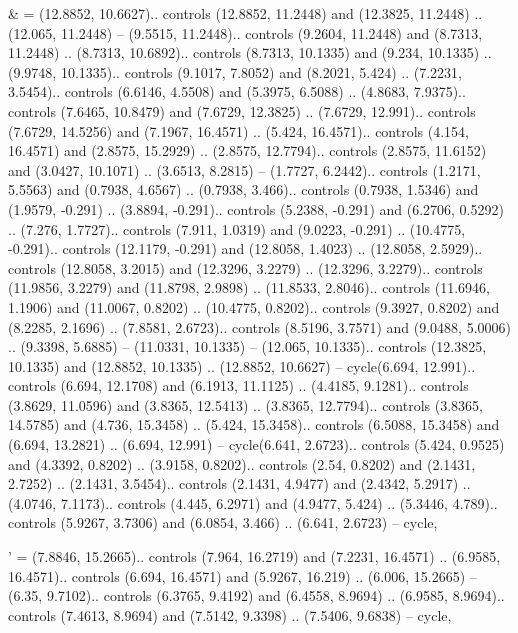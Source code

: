\& = {(12.8852, 10.6627).. controls (12.8852, 11.2448) and (12.3825, 11.2448) .. (12.065, 11.2448) -- (9.5515, 11.2448).. controls (9.2604, 11.2448) and (8.7313, 11.2448) .. (8.7313, 10.6892).. controls (8.7313, 10.1335) and (9.234, 10.1335) .. (9.9748, 10.1335).. controls (9.1017, 7.8052) and (8.2021, 5.424) .. (7.2231, 3.5454).. controls (6.6146, 4.5508) and (5.3975, 6.5088) .. (4.8683, 7.9375).. controls (7.6465, 10.8479) and (7.6729, 12.3825) .. (7.6729, 12.991).. controls (7.6729, 14.5256) and (7.1967, 16.4571) .. (5.424, 16.4571).. controls (4.154, 16.4571) and (2.8575, 15.2929) .. (2.8575, 12.7794).. controls (2.8575, 11.6152) and (3.0427, 10.1071) .. (3.6513, 8.2815) -- (1.7727, 6.2442).. controls (1.2171, 5.5563) and (0.7938, 4.6567) .. (0.7938, 3.466).. controls (0.7938, 1.5346) and (1.9579, -0.291) .. (3.8894, -0.291).. controls (5.2388, -0.291) and (6.2706, 0.5292) .. (7.276, 1.7727).. controls (7.911, 1.0319) and (9.0223, -0.291) .. (10.4775, -0.291).. controls (12.1179, -0.291) and (12.8058, 1.4023) .. (12.8058, 2.5929).. controls (12.8058, 3.2015) and (12.3296, 3.2279) .. (12.3296, 3.2279).. controls (11.9856, 3.2279) and (11.8798, 2.9898) .. (11.8533, 2.8046).. controls (11.6946, 1.1906) and (11.0067, 0.8202) .. (10.4775, 0.8202).. controls (9.3927, 0.8202) and (8.2285, 2.1696) .. (7.8581, 2.6723).. controls (8.5196, 3.7571) and (9.0488, 5.0006) .. (9.3398, 5.6885) -- (11.0331, 10.1335) -- (12.065, 10.1335).. controls (12.3825, 10.1335) and (12.8852, 10.1335) .. (12.8852, 10.6627) -- cycle(6.694, 12.991).. controls (6.694, 12.1708) and (6.1913, 11.1125) .. (4.4185, 9.1281).. controls (3.8629, 11.0596) and (3.8365, 12.5413) .. (3.8365, 12.7794).. controls (3.8365, 14.5785) and (4.736, 15.3458) .. (5.424, 15.3458).. controls (6.5088, 15.3458) and (6.694, 13.2821) .. (6.694, 12.991) -- cycle(6.641, 2.6723).. controls (5.424, 0.9525) and (4.3392, 0.8202) .. (3.9158, 0.8202).. controls (2.54, 0.8202) and (2.1431, 2.7252) .. (2.1431, 3.5454).. controls (2.1431, 4.9477) and (2.4342, 5.2917) .. (4.0746, 7.1173).. controls (4.445, 6.2971) and (4.9477, 5.424) .. (5.3446, 4.789).. controls (5.9267, 3.7306) and (6.0854, 3.466) .. (6.641, 2.6723) -- cycle},

' = {(7.8846, 15.2665).. controls (7.964, 16.2719) and (7.2231, 16.4571) .. (6.9585, 16.4571).. controls (6.694, 16.4571) and (5.9267, 16.219) .. (6.006, 15.2665) -- (6.35, 9.7102).. controls (6.3765, 9.4192) and (6.4558, 8.9694) .. (6.9585, 8.9694).. controls (7.4613, 8.9694) and (7.5142, 9.3398) .. (7.5406, 9.6838) -- cycle},

